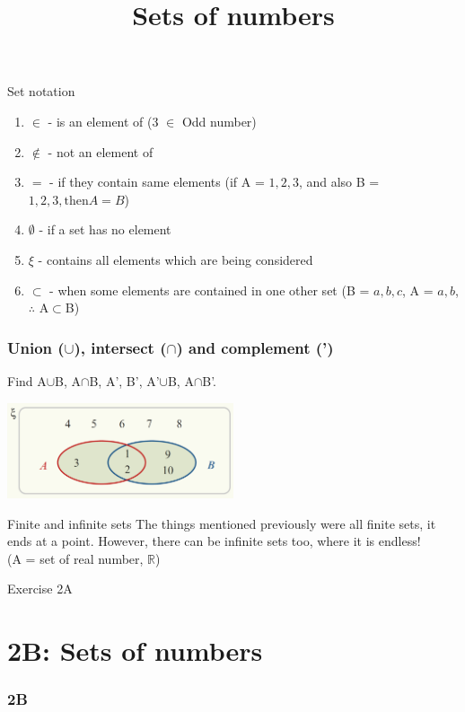 \documentclass[
	11pt, %
]{beamer}
\begin{document}
\begin{frame}{Set notation}
    \begin{enumerate}
        \item $\in$ - is an element of (3 $\in$ Odd number)
        \item $\not\in$ - not an element of
        \item $=$ - if they contain same elements (if A = ${1,2,3}$, and also B = ${1,2,3, \text{then} A=B}$)
        \item $\emptyset$ - if a set has no element
        \item $\xi$ - contains all elements which are being considered
        \item $\subset$ - when some elements are contained in one other set (B = ${a,b,c}$, A = ${a,b}$, $\therefore$ A$\subset$B)
    \end{enumerate}
\end{frame}

\begin{frame}[t]
    \frametitle{Union ($\cup$), intersect ($\cap$) and complement (')}
    Find A$\cup$B, A$\cap$B, A', B', A'$\cup$B, A$\cap$B'.\\
    \begin{center}
        \includegraphics[width=0.5\textwidth]{Venn.png}       
    \end{center}
\end{frame}

\begin{frame}{Finite and infinite sets}
    The things mentioned previously were all finite sets, it ends at a point. However, there can be infinite sets too, where
     it is endless! \\(A = set of real number, $\mathbb{R}$)
\end{frame}

\begin{frame}{Exercise 2A}
\end{frame}
\section{2B: Sets of numbers}
\begin{frame} 
    \frametitle{2B}
    \begin{center}
        \title{Sets of numbers}
        \maketitle
    \end{center}
\end{frame}
\end{document}
